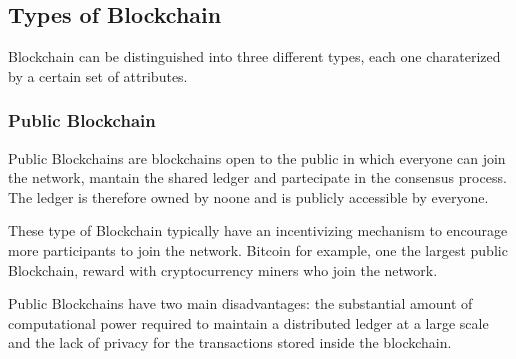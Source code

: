 \subsection{Types of Blockchain}
Blockchain can be distinguished into three different types, each one charaterized
by a certain set of attributes.
\subsubsection*{Public Blockchain}
Public Blockchains are blockchains open to the public in which everyone can join
the network, mantain the shared ledger and partecipate in the consensus process.
The ledger is therefore owned by noone and is publicly accessible by everyone.

These type of Blockchain typically have an incentivizing mechanism to encourage
more participants to join the network. Bitcoin for example, one the largest public
Blockchain, reward with cryptocurrency miners who join the network.

Public Blockchains have two main disadvantages: the substantial amount of
computational power required to maintain a distributed ledger at a large scale
and the lack of privacy for the transactions stored inside the blockchain.  
